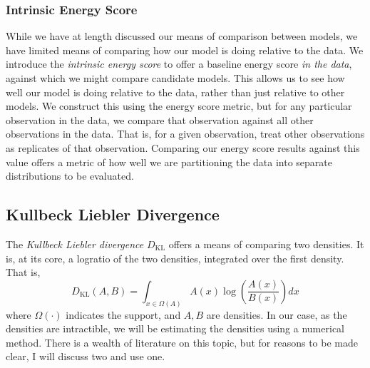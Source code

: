 
\subsubsection{Intrinsic Energy Score}
While we have at length discussed our means of comparison between models, we have limited means of
  comparing how our model is doing relative to the data.  We introduce the
  \emph{intrinsic energy score} to offer a baseline energy score \emph{in the data}, against which
  we might compare candidate models.  This allows us to see how well our model is doing relative
  to the data, rather than just relative to other models.  We construct this using the energy score
  metric, but for any particular observation in the data, we compare that observation against all
  other observations in the data.  That is, for a given observation, treat other observations as
  replicates of that observation.  Comparing our energy score results against this value offers a
  metric of how well we are partitioning the data into separate distributions to be evaluated.

\subsection{Kullbeck Liebler Divergence}
The \emph{Kullbeck Liebler divergence} $D_{\text{KL}}$ offers a means of comparing two densities.
  It is, at its core, a logratio of the two densities, integrated over the first density.  That is,
  \begin{equation}
    \label{eqn:kld}
    D_{\text{KL}}(A,B) = \int_{x\in \Omega(A)}A(x)\log\left(\frac{A(x)}{B(x)}\right)dx
  \end{equation}
  where $\Omega(\cdot)$ indicates the support, and $A,B$ are densities.  In our case, as the
  densities are intractible, we will be estimating the densities using a numerical
  method.  There is a wealth of literature on this topic, but for reasons to be made clear, I will
  discuss two and use one.

